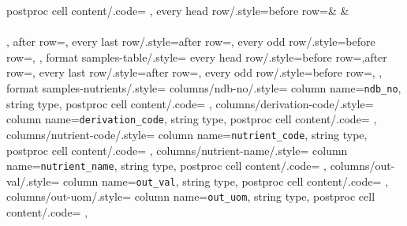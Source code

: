{{{            postproc cell content/.code={}
        },
        every head row/.style={before row=\toprule &  & \\
        \cmidrule(lr){2-4} \cmidrule(lr){5-6}\\, after row=\midrule},
        every last row/.style={after row=\bottomrule},
        every odd row/.style={before row={}},
    },
    format samples-table/.style={
        every head row/.style={before row=\toprule,after row=\midrule},
        every last row/.style={after row=\bottomrule},
        every odd row/.style={before row={}},
    },
    format samples-nutrients/.style={
        columns/ndb-no/.style={
            column name={\texttt{ndb\_no}},
            string type,
            postproc cell content/.code={}
        },
        columns/derivation-code/.style={
            column name={\texttt{derivation\_code}},
            string type,
            postproc cell content/.code={}
        },
        columns/nutrient-code/.style={
            column name={\texttt{nutrient\_code}},
            string type,
            postproc cell content/.code={}
        },
        columns/nutrient-name/.style={
            column name={\texttt{nutrient\_name}},
            string type,
            postproc cell content/.code={}
        },
        columns/out-val/.style={
            column name={\texttt{out\_val}},
            string type,
            postproc cell content/.code={}
        },
        columns/out-uom/.style={
            column name={\texttt{out\_uom}},
            string type,
            postproc cell content/.code={}
        },
    }
}

\newcommand{\notimplies}{\centernot\implies}
\newcommand{\floor}[1]{\left\lfloor #1 \right\rfloor}

\newtheorem{runexample}{Running Example}
\newtheorem{example-withrun}{Example}[runexample]

\newtheorem{runexperiment}{Running Experiment}
\newtheorem{experiment-withrun}{Experiment}[runexperiment]

\newcommand{\fncolor}[1]{\textcolor{YellowOrange}{#1}}
\newcommand{\paramcolor}[1]{\textcolor{JungleGreen}{#1}}
\newcommand{\cmtcolor}[1]{\textcolor{Gray}{#1}}

\makeatletter
\newcommand{\removelatexerror}{\let\@latex@error\@gobble}
\makeatother
